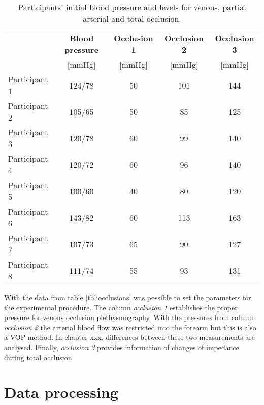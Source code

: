 \begin{table}[!htbp] %
	\caption[Blood pressure and occlusion levels of the participants]{Participants' initial blood pressure and levels for venous, partial arterial and total occlusion.}
	\label{tbl: venous occlusions}
	\centering
	\begin{tabular}    {lcccc}
		\toprule
		& \textbf{Blood pressure}  &  \textbf{Occlusion 1}   & \textbf{Occlusion 2}  &  \textbf{Occlusion 3} \\
		&  [\si{\mmHg}]   &        [\si{\mmHg}]  &    [\si{\mmHg}]   &  [\si{\mmHg}]\\ \midrule
		Participant 1  &  124/78   &        50  &    101   &  144\\ 
		Participant 2  &  105/65   &        50  &     85   &  125 \\
		Participant 3  &  120/78   &        60  &     99   &  140 \\
		Participant 4  &  120/72   &        60  &     96   &  140 \\
		Participant 5  &  100/60   &        40  &     80   &  120 \\
		Participant 6  &  143/82   &        60  &    113   &  163 \\
		Participant 7  &  107/73   &        65  &     90   &  127 \\
		Participant 8  &  111/74   &        55  &     93   &  131 \\\bottomrule
	\end{tabular}
\end{table}

With the data from table \ref{tbl:occlusions} was possible to set the parameters for the experimental procedure. The column \textit{occlusion 1} establishes the proper pressure for venous occlusion plethysmography. With the pressures from column \textit{occlusion 2} the arterial blood flow was restricted into the forearm but this is also a VOP method. In chapter xxx,  differences between these two measurements are analysed. Finally, \textit{occlusion 3} provides information of changes of impedance during total occlusion.

\section{Data processing}
\label{section procedure 3}

